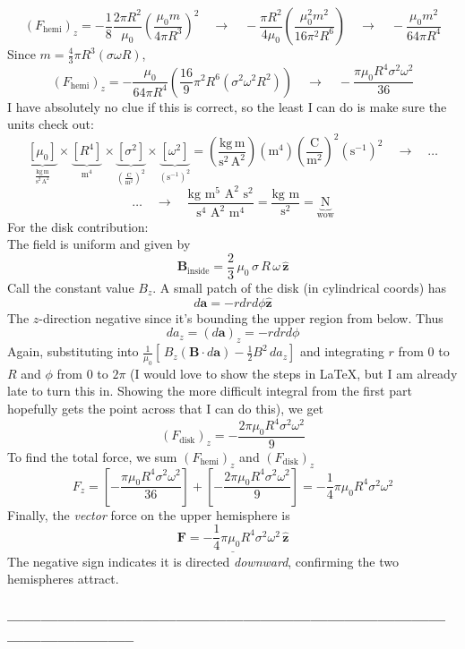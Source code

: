 \documentclass[a4paper,12pt]{article} %
\begin{document}
$$ \left(F_{\text{hemi}}\right)_z = -\frac{1}{8}\frac{2\pi R^2}{\mu_0}\left(\frac{\mu_0m}{4\pi R^3}\right)^2 \quad\rightarrow\quad -\frac{\pi R^2}{4\mu_0} \left(\frac{\mu_0^2m^2}{16\pi^2R^6}\right) \quad\rightarrow\quad -\frac{\mu_0m^2}{64\pi R^4}$$
Since $m=\frac{4}{3} \pi R^3(\sigma \omega R)$,
$$ \boxed{\left(F_{\text{hemi}}\right)_z = -\frac{\mu_0}{64\pi R^4} \left(\frac{16}{9}\pi^2 R^6 \left(\sigma^2\omega^2R^2\right)\right) \quad\rightarrow\quad -\frac{\pi\mu_0R^4\sigma^2\omega^2}{36}}$$
I have absolutely no clue if this is correct, so the least I can do is make sure the units check out:
$$
\underbrace{\left[\mu_0\right]}_{\frac{\mathrm{kg}\,\mathrm{m}}{\mathrm{s}^2\,\mathrm{A}^2}}
\times
\underbrace{\left[R^4\right]}_{\mathrm{m}^4}
\times
\underbrace{\left[\sigma^2\right]}_{\left(\frac{\mathrm{C}}{\mathrm{m}^2}\right)^2}
\times
\underbrace{\left[\omega^2\right]}_{\left(\mathrm{s}^{-1}\right)^2}
=
\left(\frac{\mathrm{kg}\,\mathrm{m}}{\mathrm{s}^2\,\mathrm{A}^2}\right)
\left(\mathrm{m}^4\right)
\left(\frac{\mathrm{C}}{\mathrm{m}^2}\right)^2
(\mathrm{s}^{-1})^2 \quad\rightarrow\quad\ldots
$$
$$ 
\ldots\quad\rightarrow\quad \frac{\text{kg} \text{ m}^5 \text{ A}^2 \text{ s}^2}{\text{s}^4 \text{ A}^2 \text{ m}^4} = \frac{\text{kg} \text{ m}}{\text{s}^2} = \underbrace{\boxed{\text{N}}}_{\text{wow}}
$$
For the disk contribution:\\

The field is uniform and given by
$$\mathbf{B}_{\text{inside}}=\frac{2}{3}\,\mu_0\,\sigma\,R\,\omega\,\hat{\mathbf{z}}
$$
Call the constant value $B_z$. A small patch of the disk (in cylindrical coords) has
$$
d\mathbf{a} = -rdrd\phi\hat{\mathbf{z}}
$$
The $z$-direction negative since it’s bounding the upper region from below. Thus
$$
d a_z = (d\mathbf{a})_z = -rdrd\phi
$$
Again, substituting into 
$\frac{1}{\mu_0}[\,B_z(\mathbf{B}\cdot d\mathbf{a}) - \tfrac12 B^2\,d a_z]$
and integrating $r$ from 0 to $R$ and $\phi$ from 0 to $2\pi$ (I would love to show the steps in \LaTeX, but I am already late to turn this in. Showing the more difficult integral from the first part hopefully gets the point across that I can do this), we get
$$
\boxed{\left(F_{\text{disk}}\right)_z=-\frac{2\pi\mu_0R^4\sigma^2\omega^2}{9}}
$$
To find the total force, we sum $\left(F_{\text{hemi}}\right)_z$ and $\left(F_{\text{disk}}\right)_z$
$$
F_z=\left[-\frac{\pi\mu_0R^4\sigma^2\omega^2}{36}\right] + \left[-\frac{2\pi\mu_0R^4\sigma^2\omega^2}{9}\right] = -\frac{1}{4}\pi\mu_0R^4\sigma^2\omega^2
$$
Finally, the \emph{vector} force on the upper hemisphere is 
$$
\underline{\boxed{\mathbf{F}= -\frac{1}{4}\pi\mu_0R^4\sigma^2\omega^2\,\hat{\mathbf{z}}}}
$$
The negative sign indicates it is directed \emph{downward}, confirming the two hemispheres attract.
\subsubsection*{-----------------------------------------------------------------------------------------------------}
\end{document}
